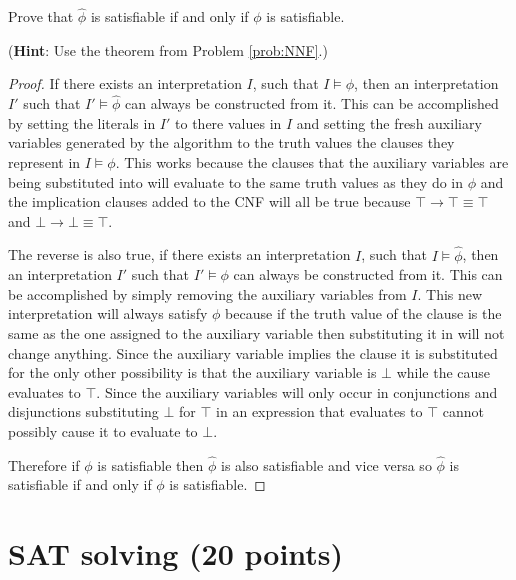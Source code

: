 \documentclass{article}
\newenvironment{solution}{\color{blue} \em }{}
\begin{document}
\begin{enumerate}
\medskip
Prove that $\hat{\phi}$ is satisfiable if and only if $\phi$ is satisfiable.

\medskip
(\textbf{Hint}: Use the theorem from Problem \ref{prob:NNF}.)

\begin{solution}
	\begin{proof}
		If there exists an interpretation $I$, such that $I \models \phi$, then an interpretation $I'$ such that $I' \models \hat{\phi}$ can always be constructed from it. This can be accomplished by setting the literals in $I'$ to there values in $I$ and setting the fresh auxiliary variables generated by the algorithm to the truth values the clauses they represent in $I \models \phi$. This works because the clauses that the auxiliary variables are being substituted into will evaluate to the same truth values as they do in $\phi$ and the implication clauses added to the CNF will all be true because $\top \rightarrow \top \equiv \top$ and $\bot \rightarrow \bot \equiv \top$.
		
		\item The reverse is also true, if there exists an interpretation $I$, such that $I \models \hat{\phi}$, then an interpretation $I'$ such that $I' \models \phi$ can always be constructed from it. This can be accomplished by simply removing the auxiliary variables from $I$. This new interpretation will always satisfy $\phi$ because if the truth value of the clause is the same as the one assigned to the auxiliary variable then substituting it in will not change anything. Since the auxiliary variable implies the clause it is substituted for the only other possibility is that the auxiliary variable is $\bot$ while the cause evaluates to $\top$. Since the auxiliary variables will only occur in conjunctions and disjunctions substituting $\bot$ for $\top$ in an expression that evaluates to $\top$ cannot possibly cause it to evaluate to $\bot$.
		
		\item Therefore if $\phi$ is satisfiable then $\hat{\phi}$ is also satisfiable and vice versa so $\hat{\phi}$ is satisfiable if and only if $\phi$ is satisfiable.
	\end{proof}
\end{solution}

\end{enumerate}

\pagebreak

\section{SAT solving (20 points)}\label{solving}
\end{document}
